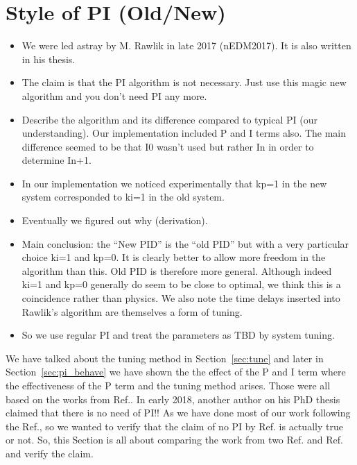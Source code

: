 


\section{Style of PI (Old/New)}\label{sec:style_pi}

\begin{itemize}
\item We were led astray by M. Rawlik in late 2017 (nEDM2017).  It is also written in his thesis.
\item The claim is that the PI algorithm is not necessary.  Just use this magic new algorithm and you don't need PI any more.
\item Describe the algorithm and its difference compared to typical PI (our understanding).  Our implementation included P and I terms also.  The main difference seemed to be that I0 wasn't used but rather In in order to determine In+1.
\item In our implementation we noticed experimentally that kp=1 in the new system corresponded to ki=1 in the old system.
\item Eventually we figured out why (derivation).
\item Main conclusion:  the ``New PID'' is the ``old PID'' but with a very particular choice ki=1 and kp=0.  It is clearly better to allow more freedom in the algorithm than this.  Old PID is therefore more general.  Although indeed ki=1 and kp=0 generally do seem to be close to optimal, we think this is a coincidence rather than physics.  We also note the time delays inserted into Rawlik's algorithm are themselves a form of tuning.
\item So we use regular PI and treat the parameters as TBD by system tuning.
\end{itemize}


We have talked about the tuning method in Section~\ref{sec:tune} and
later in Section~\ref{sec:pi_behave} we have shown the the effect of
the P and I term where the effectiveness of the P term and the tuning
method arises. Those were all based on the works from
Ref.\cite{bea}. In early 2018, another author on his PhD
thesis \cite{rawlik} claimed that there is no need of PI!! As we have
done most of our work following the Ref.\cite{bea}, so we wanted to
verify that the claim of no PI by Ref.\cite{rawlik} is actually true
or not. So, this Section is all about comparing the work from two
Ref.\cite{bea} and Ref.\cite{rawlik} and verify the claim.

